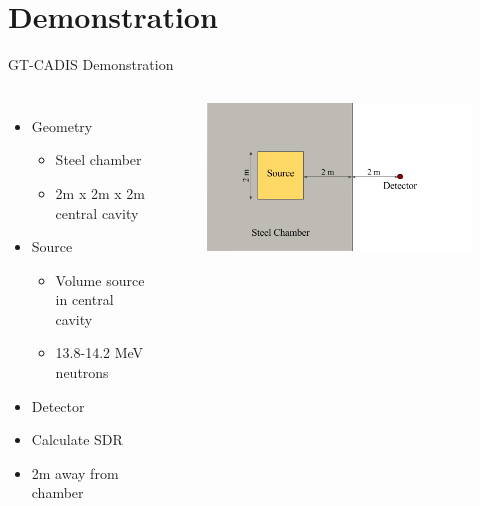 \documentclass{beamer}
\begin{document}
%


\section{Demonstration}
\begin{frame}{GT-CADIS Demonstration}
	\begin{columns}
           \begin{itemize}
		   \item{Geometry}
			   \begin{itemize}
				   \item{Steel chamber}
				   \item{2m x 2m x 2m central cavity}
			   \end{itemize}
		   \item{Source}
			   \begin{itemize}
				   \item{Volume source in central cavity}
				   \item{13.8-14.2 MeV neutrons}
			   \end{itemize}
		   \item{Detector}
			   \item{Calculate SDR}
			   \item{2m away from chamber}
	   \end{itemize}
		\begin{figure}
		\centering
		\includegraphics[scale=0.40]{orig_geom_pres.png}
                \end{figure}
	\end{columns}
\end{frame}
\end{document}
